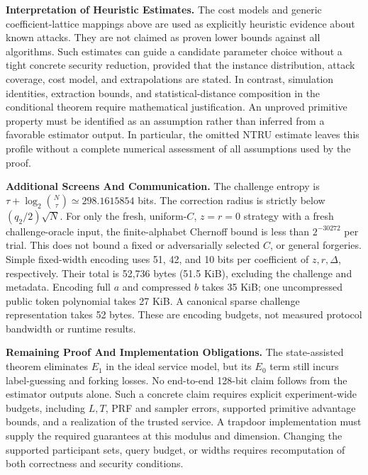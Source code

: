 \documentclass[lettersize,journal]{IEEEtran}
\newcommand{\parab}[1]{\noindent\textbf{#1} }
\begin{document}
	\parab{Interpretation of Heuristic Estimates.}
	The cost models and generic coefficient-lattice mappings above are used
	as explicitly heuristic evidence about known attacks. They are not
	claimed as proven lower bounds against all algorithms. Such estimates
	can guide a candidate parameter choice without a tight concrete security
	reduction, provided that the instance distribution, attack coverage,
	cost model, and extrapolations are stated. In contrast, simulation
	identities, extraction bounds, and statistical-distance composition in
	the conditional theorem require mathematical justification. An
	unproved primitive property must be identified as an assumption rather
	than inferred from a favorable estimator output. In particular, the
	omitted NTRU estimate leaves this profile without a complete numerical
	assessment of all assumptions used by the proof.
	
	\parab{Additional Screens And Communication.}
	The challenge entropy is
	$\tau+\log_2\binom N\tau\simeq298.1615854$ bits. The correction radius
	is strictly below $(q_2/2)\sqrt N$. For only the fresh, uniform-$C$,
	$z=r=0$ strategy with a fresh challenge-oracle input, the finite-alphabet Chernoff bound is
	less than $2^{-30272}$ per trial. This does not bound a fixed or
	adversarially selected $C$, or general forgeries.
	Simple fixed-width encoding uses 51, 42, and 10 bits per coefficient
	of $z,r,\Delta$, respectively. Their total is 52,736 bytes (51.5 KiB),
	excluding the challenge and metadata. Encoding full $a$ and compressed
	$b$ takes 35 KiB; one uncompressed public token polynomial takes 27 KiB.
	A canonical sparse challenge representation takes 52 bytes. These are
	encoding budgets, not measured protocol bandwidth or runtime results.
	
	\parab{Remaining Proof And Implementation Obligations.}
	The state-assisted theorem eliminates $E_1$ in the ideal service model,
	but its $E_0$ term still incurs label-guessing and forking losses. No
	end-to-end 128-bit claim follows from the estimator outputs alone. Such
	a concrete claim requires explicit experiment-wide budgets, including
	$L,T$, PRF and sampler errors, supported primitive advantage bounds,
	and a realization of the trusted service. A trapdoor implementation must supply the required guarantees at
	this modulus and dimension. Changing the supported participant sets,
	query budget, or widths requires recomputation of both correctness and
	security conditions.
	
\end{document}
